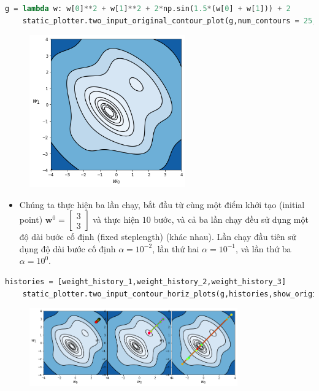 \documentclass{book}
\begin{document}
\begin{lstlisting}[language=python]
    g = lambda w: w[0]**2 + w[1]**2 + 2*np.sin(1.5*(w[0] + w[1])) + 2
    static_plotter.two_input_original_contour_plot(g,num_contours = 25,xmin = -4,xmax = 4, ymin = -4, ymax = 4)
\end{lstlisting}
\begin{figure}[H]
    \centering
    \includegraphics[width=0.6\textwidth]{images/oscillation_in_cost_history.png}
\end{figure}
\begin{itemize}
    \item Chúng ta thực hiện ba lần chạy, bắt đầu từ cùng một điểm khởi tạo (initial point) $\mathbf{w}^{0} = \begin{bmatrix} 3 \\ 3 \end{bmatrix}$ và thực hiện $10$ bước, và cả ba lần chạy đều sử dụng một độ dài bước cố định (fixed steplength) (khác nhau). Lần chạy đầu tiên sử dụng độ dài bước cố định $\alpha = 10^{-2}$, lần thứ hai $\alpha = 10^{-1}$, và lần thứ ba $\alpha = 10^{0}$. 
\end{itemize}
\begin{lstlisting}[language=python]
    histories = [weight_history_1,weight_history_2,weight_history_3]
    static_plotter.two_input_contour_horiz_plots(g,histories,show_original=False,num_contours=25,xmin=-4,xmax=4,ymin=-4,ymax=4)
\end{lstlisting}
\begin{figure}[H]
    \centering
    \includegraphics[width=0.8\textwidth]{images/oscillation_in_cost_history_2.png}
\end{figure}
\end{document}
